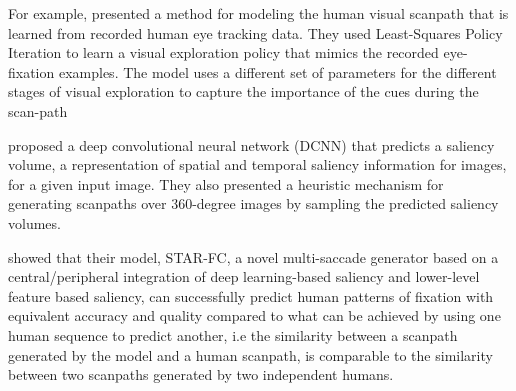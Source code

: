 \documentclass{article} %
\begin{document}
For example, \cite{jiang_boix_roig_xu_gool_zhao_2016} presented a method for modeling the human visual scanpath that is learned from recorded human eye tracking data. They used Least-Squares Policy Iteration to learn a visual exploration policy that mimics the recorded eye-fixation examples. The model uses a different set of parameters for the different stages of visual exploration to capture the importance of the cues during the scan-path

\cite{DBLP:journals/corr/AssensMGO17} proposed a deep convolutional neural network (DCNN) that predicts
a saliency volume,  a representation of spatial and temporal saliency information for images, for a given input image. They also presented a heuristic mechanism for  generating scanpaths over  360-degree images by sampling the predicted saliency volumes.

\cite{DBLP:journals/corr/abs-1711-10959} showed that their model, STAR-FC, a novel multi-saccade generator based on a central/peripheral integration of deep learning-based saliency and lower-level feature based saliency, can successfully predict human patterns of fixation with equivalent accuracy and quality compared to what can be achieved by using one human sequence to predict another, i.e the similarity between a scanpath generated by the model and a human scanpath, is comparable to the similarity between two scanpaths generated by two independent humans. 
\end{document}
